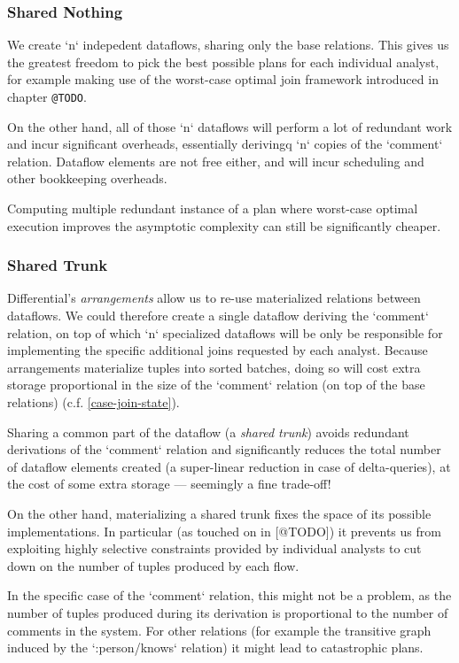 \documentclass[../catalog.tex]{subfiles}
\begin{document}
\subsubsection{Shared Nothing}

We create `n` indepedent dataflows, sharing only the base
relations. This gives us the greatest freedom to pick the best
possible plans for each individual analyst, for example making use of
the worst-case optimal join framework introduced in chapter \texttt{@TODO}.

On the other hand, all of those `n` dataflows will perform a lot of
redundant work and incur significant overheads, essentially
derivingq `n` copies of the `comment` relation. Dataflow elements
are not free either, and will incur scheduling and other bookkeeping
overheads.

Computing multiple redundant instance of a plan where worst-case
optimal execution improves the asymptotic complexity can still be
significantly cheaper.

\subsubsection{Shared Trunk}

Differential's \emph{arrangements} allow us to re-use materialized
relations between dataflows. We could therefore create a single
dataflow deriving the `comment` relation, on top of which `n`
specialized dataflows will be only be responsible for implementing the
specific additional joins requested by each analyst. Because
arrangements materialize tuples into sorted batches, doing so will
cost extra storage proportional in the size of the `comment` relation
(on top of the base relations) (c.f. \ref{case-join-state}).

Sharing a common part of the dataflow (a \emph{shared trunk}) avoids
redundant derivations of the `comment` relation and significantly
reduces the total number of dataflow elements created (a super-linear
reduction in case of delta-queries), at the cost of some extra storage
— seemingly a fine trade-off!

On the other hand, materializing a shared trunk fixes the space of its
possible implementations. In particular (as touched on in [@TODO]) it
prevents us from exploiting highly selective constraints provided by
individual analysts to cut down on the number of tuples produced by
each flow.

In the specific case of the `comment` relation, this might not be a
problem, as the number of tuples produced during its derivation is
proportional to the number of comments in the system. For other
relations (for example the transitive graph induced by the
`:person/knows` relation) it might lead to catastrophic plans.
\end{document}
